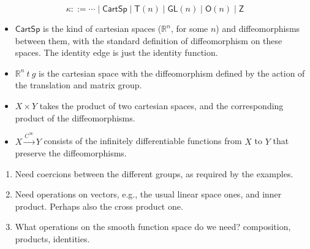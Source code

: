 \documentclass[preprint]{sigplanconf}
\newcommand{\sepbar}{\mathrel|}
\newcommand{\smoothrightarrow}{\stackrel{C^\infty}\longrightarrow}
\theoremstyle{examplestyle}
\begin{document}
\begin{displaymath}
  \kappa ::= \cdots \sepbar \mathsf{CartSp} \sepbar \mathsf{T}(n) \sepbar \mathsf{GL}(n) \sepbar \mathsf{O}(n) \sepbar \mathsf{Z}
\end{displaymath}

\begin{itemize}
\item $\mathsf{CartSp}$ is the kind of cartesian spaces
  ($\mathbb{R}^n$, for some $n$) and diffeomorphisms between them,
  with the standard definition of diffeomorphism on these spaces. The
  identity edge is just the identity function.
\item $\mathbb{R}^n~t~g$ is the cartesian space with the
  diffeomorphism defined by the action of the translation and matrix
  group.
\item $X \times Y$ takes the product of two cartesian spaces, and the
  corresponding product of the diffeomorphisms.
\item $X \smoothrightarrow Y$ consists of the infinitely
  differentiable functions from $X$ to $Y$ that preserve the
  diffeomorphisms.
\end{itemize}

\begin{enumerate}
\item Need coercions between the different groups, as required by the
  examples.
\item Need operations on vectors, e.g., the usual linear space ones,
  and inner product. Perhaps also the cross product one.
\item What operations on the smooth function space do we need?
  composition, products, identities.
\end{enumerate}
\end{document}
